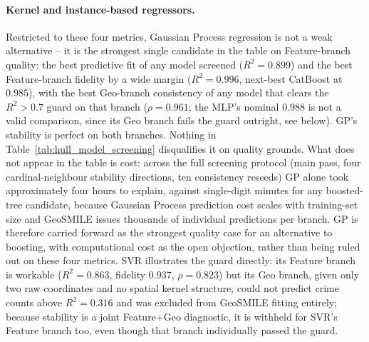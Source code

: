 \paragraph{Kernel and instance-based regressors.} Restricted to these four
metrics, Gaussian Process regression is not a weak alternative -- it is the
strongest single candidate in the table on Feature-branch quality: the best
predictive fit of any model screened ($R^2=0.899$) and the best Feature-branch
fidelity by a wide margin ($R^2=0.996$, next-best CatBoost at $0.985$), with
the best Geo-branch consistency of any model that clears the $R^2>0.7$ guard
on that branch ($\rho=0.961$; the MLP's nominal $0.988$ is not a valid
comparison, since its Geo branch fails the guard outright, see below).
GP's stability is perfect on both branches. Nothing in
Table~\ref{tab:hull_model_screening} disqualifies it on quality grounds. What
does not appear in the table is cost: across the full screening protocol
(main pass, four cardinal-neighbour stability directions, ten consistency
reseeds) GP alone took approximately four hours to explain, against
single-digit minutes for any boosted-tree candidate, because Gaussian
Process prediction cost scales with training-set size and GeoSMILE issues
thousands of individual predictions per branch. GP is therefore carried
forward as the strongest quality case for an alternative to boosting, with
computational cost as the open objection, rather than being ruled out on
these four metrics. SVR illustrates the guard directly: its Feature branch
is workable ($R^2=0.863$, fidelity $0.937$, $\rho=0.823$) but its Geo branch,
given only two raw coordinates and no spatial kernel structure, could not
predict crime counts above $R^2=0.316$ and was excluded from GeoSMILE
fitting entirely; because stability is a joint Feature+Geo diagnostic, it is
withheld for SVR's Feature branch too, even though that branch individually
passed the guard.

